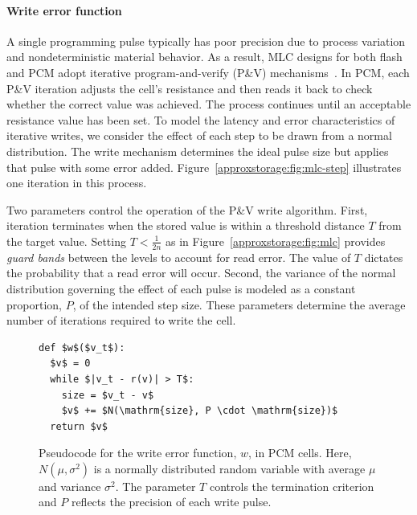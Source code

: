 \paragraph{Write error function}

A single programming pulse typically has poor
precision due to process variation and nondeterministic material
behavior. As a result, MLC designs for both flash and PCM adopt iterative
program-and-verify (P\&V) mechanisms~\cite{morphablepcm,mlcflash}.
In PCM, each P\&V iteration adjusts the cell's resistance and then reads it
back to check whether the
correct value was achieved.
The process continues until an acceptable resistance value has been set.
To model the latency and error characteristics of iterative writes, we
consider the effect of each step to be drawn from a normal
distribution. The write mechanism determines the ideal pulse size but
applies that pulse with some error added.
Figure~\ref{approxstorage:fig:mlc-step} illustrates one iteration in this process.

Two parameters control the operation of the P\&V write algorithm.
First, iteration terminates when the stored value is within a
threshold distance $T$ from the target value. 
Setting $T < \frac{1}{2n}$ as in Figure~\ref{approxstorage:fig:mlc} provides \emph{guard bands} between the
levels to account for read error. The value of $T$ dictates the probability
that a read error will occur.
Second, the variance of
the normal distribution governing the effect of each pulse is modeled
as a constant proportion, $P$, of the intended step size. These parameters
determine the average number of iterations required to write the cell.

\begin{figure}
    \begin{center}
    \begin{minipage}{2in}
    \begin{lstlisting}[mathescape]
def $w$($v_t$):
  $v$ = 0
  while $|v_t - r(v)| > T$:
    size = $v_t - v$
    $v$ += $N(\mathrm{size}, P \cdot \mathrm{size})$
  return $v$
\end{lstlisting}
    \end{minipage}
    \end{center}
    \caption{
        Pseudocode for the write error function, $w$, in PCM
        cells.
        Here, $N(\mu, \sigma^2)$ is a normally distributed random
        variable
        with average $\mu$ and variance
        $\sigma^2$. The parameter $T$ controls the termination
        criterion and $P$ reflects the precision of each write pulse.
    }
    \label{approxstorage:fig:pcode-pcm}
\end{figure}

